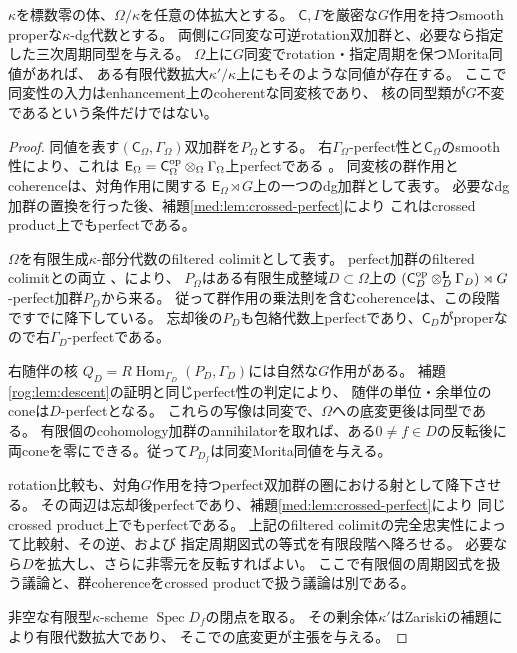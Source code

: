 \begin{lemma}[同変同値核の有限代数拡大上の存在]
\label{med:lem:equivariant-descent}
$\kappa$を標数零の体、$\Omega/\kappa$を任意の体拡大とする。
$\mathsf C,\Gamma$を厳密な$G$作用を持つsmooth properな$\kappa$-dg代数とする。
両側に$G$同変な可逆rotation双加群と、必要なら指定した三次周期同型を与える。
$\Omega$上に$G$同変でrotation・指定周期を保つMorita同値があれば、
ある有限代数拡大$\kappa'/\kappa$上にもそのような同値が存在する。
ここで同変性の入力はenhancement上のcoherentな同変核であり、
核の同型類が$G$不変であるという条件だけではない。
\end{lemma}
\begin{proof}
同値を表す$(\mathsf C_\Omega,\Gamma_\Omega)$双加群を$P_\Omega$とする。
右$\Gamma_\Omega$-perfect性と$\mathsf C_\Omega$のsmooth性により、これは
$\mathsf E_\Omega=\mathsf C_\Omega^{\rm op}\otimes_\Omega\Gamma_\Omega$上perfectである
\cite[Lemma~2.8(2)]{ROGTV}。
同変核の群作用とcoherenceは、対角作用に関する
$\mathsf E_\Omega\rtimes G$上の一つのdg加群として表す。
必要なdg加群の置換を行った後、補題\ref{med:lem:crossed-perfect}により
これはcrossed product上でもperfectである。

$\Omega$を有限生成$\kappa$-部分代数のfiltered colimitとして表す。
perfect加群のfiltered colimitとの両立
\cite[Lemma~2.10]{ROGTV}、\cite[F4]{ROGToenDefinition}により、
$P_\Omega$はある有限生成整域$D\subset\Omega$上の
$(\mathsf C_D^{\rm op}\otimes_D^{\mathbf L}\Gamma_D)\rtimes G$-perfect加群$P_D$から来る。
従って群作用の乗法則を含むcoherenceは、この段階ですでに降下している。
忘却後の$P_D$も包絡代数上perfectであり、$\mathsf C_D$がproperなので右$\Gamma_D$-perfectである。

右随伴の核
$Q_D=R\operatorname{Hom}_{\Gamma_D}(P_D,\Gamma_D)$には自然な$G$作用がある。
補題\ref{rog:lem:descent}の証明と同じperfect性の判定により、
随伴の単位・余単位のconeは$D$-perfectとなる。
これらの写像は同変で、$\Omega$への底変更後は同型である。
有限個のcohomology加群のannihilatorを取れば、ある$0\ne f\in D$の反転後に
両coneを零にできる。従って$P_{D_f}$は同変Morita同値を与える。

rotation比較も、対角$G$作用を持つperfect双加群の圏における射として降下させる。
その両辺は忘却後perfectであり、補題\ref{med:lem:crossed-perfect}により
同じcrossed product上でもperfectである。
上記のfiltered colimitの完全忠実性によって比較射、その逆、および
指定周期図式の等式を有限段階へ降ろせる。
必要なら$D$を拡大し、さらに非零元を反転すればよい。
ここで有限個の周期図式を扱う議論と、群coherenceをcrossed productで扱う議論は別である。

非空な有限型$\kappa$-scheme $\operatorname{Spec}D_f$の閉点を取る。
その剰余体$\kappa'$はZariskiの補題により有限代数拡大であり、
そこでの底変更が主張を与える。
\end{proof}

